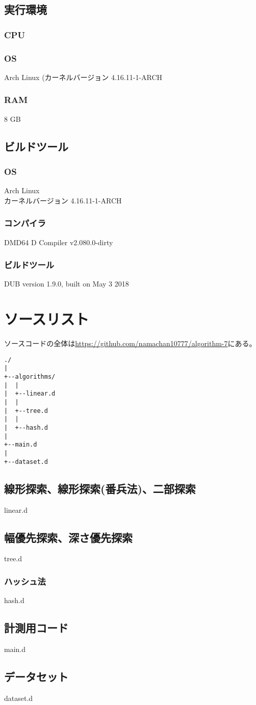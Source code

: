 \documentclass[dvipdfmx]{jsarticle}
\begin{document}
		\subsection{実行環境}
			\subsubsection{CPU}
			\subsubsection{OS}
				Arch Linux
				(カーネルバージョン 4.16.11-1-ARCH
			\subsubsection{RAM}
				8 GB
		\subsection{ビルドツール}
			\subsubsection{OS}
				Arch Linux \\
				カーネルバージョン 4.16.11-1-ARCH
			\subsubsection{コンパイラ}
				DMD64 D Compiler v2.080.0-dirty
			\subsubsection{ビルドツール}
				DUB version 1.9.0, built on May  3 2018
	\section{ソースリスト}
		ソースコードの全体は\url{https://github.com/namachan10777/algorithm-7}にある。
		\begin{verbatim}
./
|
+--algorithms/
|  |
|  +--linear.d
|  |
|  +--tree.d
|  |
|  +--hash.d
|
+--main.d
|
+--dataset.d
		\end{verbatim}
		\subsection{線形探索、線形探索(番兵法)、二部探索}
			linear.d
			\newpage
		\subsection{幅優先探索、深さ優先探索}
			tree.d
			\newpage
		\subsubsection{ハッシュ法}
			hash.d
			\newpage
		\subsection{計測用コード}
			main.d
			\newpage
		\subsection{データセット}
			dataset.d
			\newpage
\end{document}
